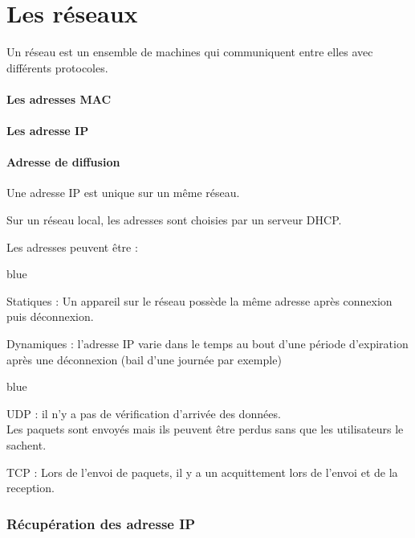 
\part{Les réseaux}


Un réseau est un ensemble de machines qui communiquent entre elles avec différents protocoles.\\

\subsection{Les adresses MAC}
\subsection{Les adresse IP}
\subsection{Adresse de diffusion}

Une adresse IP est unique sur un même réseau.

Sur un réseau local, les adresses sont choisies par un serveur DHCP.

Les adresses peuvent être :

\begin{items}{blue}{\Bullet}
	\item Statiques : Un appareil sur le réseau possède la même adresse après connexion puis déconnexion.
	\item Dynamiques : l'adresse IP varie dans le temps au bout d'une période d'expiration après une déconnexion (bail d'une journée par exemple)
\end{items}


\begin{items}{blue}{\Bullet}
\item UDP : il n'y a pas de vérification d'arrivée des données.\\ Les paquets sont envoyés mais ils peuvent être perdus sans que les utilisateurs le sachent.
\item TCP : Lors de l'envoi de paquets, il y a un acquittement lors de l'envoi et de la reception.
\end{items}


\section{Récupération des adresse IP}

